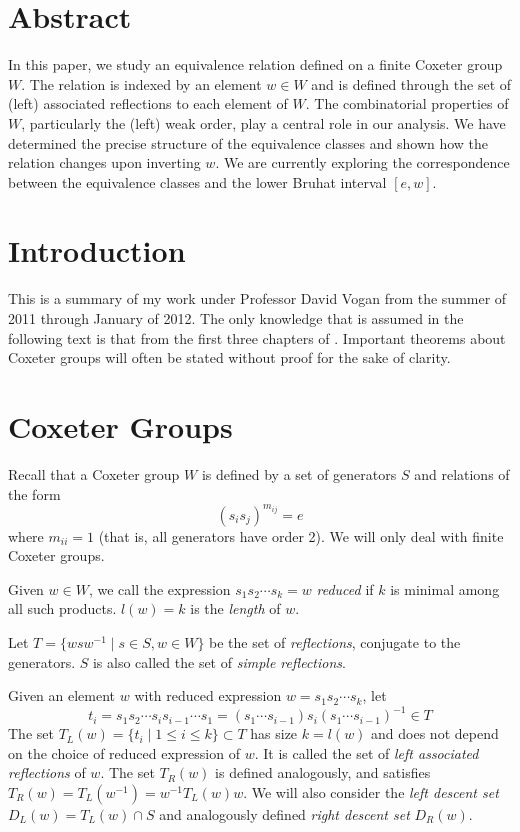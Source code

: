 \documentclass[10pt]{amsart}
\theoremstyle{definition}
\theoremstyle{definition}
\begin{document}
\section{Abstract}


In this paper, we study an equivalence relation defined on a finite Coxeter group $W$. The relation is indexed by an element $w\in W$ and is defined through the set of (left) associated reflections to each element of $W$. The combinatorial properties of $W$, particularly the (left) weak order, play a central role in our analysis. We have determined the precise structure of the equivalence classes and shown how the relation changes upon inverting $w$. We are currently exploring the correspondence between the equivalence classes and the lower Bruhat interval $[e, w]$.

\section{Introduction}
This is a summary of my work under Professor David Vogan from the summer of 2011 through January of 2012. The only knowledge that is assumed in the following text is that from the first three chapters of \cite{BB}. Important theorems about Coxeter groups will often be stated without proof for the sake of clarity.

\section{Coxeter Groups}
Recall that a Coxeter group $W$ is defined by a set of generators $S$ and relations of the form
\[
(s_i s_j)^{m_{ij}} = e
\]
where $m_{ii}=1$ (that is, all generators have order 2). We will only deal with finite Coxeter groups.

Given $w \in W$, we call the expression $s_1s_2\cdots s_k = w$ \emph{reduced} if $k$ is minimal among all such products. $l(w) = k$ is the \emph{length} of $w$.

Let $T = \{wsw^{-1} \mid s\in S, w \in W\}$ be the set of \emph{reflections}, conjugate to the generators. $S$ is also called the set of \emph{simple reflections}.

Given an element $w$ with reduced expression $w = s_1s_2\cdots s_k$, let
\[
t_i = s_1s_2\cdots s_is_{i-1}\cdots s_1 = (s_1\cdots s_{i-1}) s_i (s_1\cdots s_{i-1})^{-1} \in T
\]
The set $T_L(w) = \{t_i \mid 1\leq i\leq k\} \subset T$ has size $k = l(w)$ and does not depend on the choice of reduced expression of $w$. It is called the set of \emph{left associated reflections} of $w$. The set $T_R(w)$ is defined analogously, and satisfies $T_R(w) = T_L(w^{-1}) = w^{-1}T_L(w)w$. We will also consider the \emph{left descent set} $D_L(w) = T_L(w) \cap S$ and analogously defined \emph{right descent set} $D_R(w)$.
\end{document}
